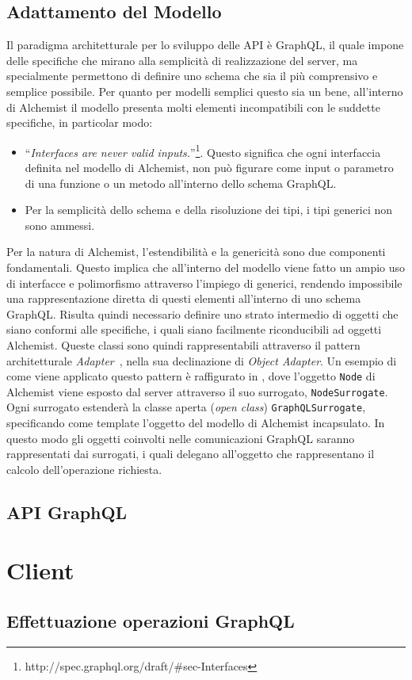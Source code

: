 \subsection{Adattamento del Modello}\label{ssec:model-adaptation}
Il paradigma architetturale per lo sviluppo delle API è GraphQL, il quale impone delle specifiche che mirano alla semplicità di realizzazione del server,
ma specialmente permettono di definire uno schema che sia il più comprensivo e semplice possibile. Per quanto per modelli semplici questo sia un bene,
all'interno di Alchemist il modello presenta molti elementi incompatibili con le suddette specifiche, in particolar modo:
\begin{itemize}
    \item ``\textit{Interfaces are never valid inputs.}''\footnote{http://spec.graphql.org/draft/\#sec-Interfaces}. Questo significa che ogni interfaccia
        definita nel modello di Alchemist, non può figurare come input o parametro di una funzione o un metodo all'interno dello schema GraphQL.
    \item Per la semplicità dello schema e della risoluzione dei tipi, i tipi generici non sono ammessi.
\end{itemize}
Per la natura di Alchemist, l'estendibilità e la genericità sono due componenti fondamentali. Questo implica che all'interno del modello viene fatto un
ampio uso di interfacce e polimorfismo attraverso l'impiego di generici, rendendo impossibile una rappresentazione diretta di questi elementi all'interno
di uno schema GraphQL.
Risulta quindi necessario definire uno strato intermedio di oggetti che siano conformi alle specifiche, i quali siano facilmente riconducibili ad oggetti
Alchemist. Queste classi sono quindi rappresentabili attraverso il pattern architetturale \textit{Adapter}~\cite{design-patterns}, nella sua declinazione
di \textit{Object Adapter}. Un esempio di come viene applicato questo pattern è raffigurato in , dove l'oggetto \texttt{Node} di Alchemist
viene esposto dal server attraverso il suo surrogato, \texttt{NodeSurrogate}.
%
%
Ogni surrogato estenderà la classe aperta (\textit{open class}) \texttt{GraphQLSurrogate}, specificando come template l'oggetto del modello di Alchemist
incapsulato.
%
In questo modo gli oggetti coinvolti nelle comunicazioni GraphQL saranno rappresentati dai surrogati, i quali delegano all'oggetto che rappresentano
il calcolo dell'operazione richiesta.

\subsection{API GraphQL}\label{ssec:server-gql-apis}

\section{Client}\label{sec:client}

\subsection{Effettuazione operazioni GraphQL}\label{ssec:client-gql-apis}

